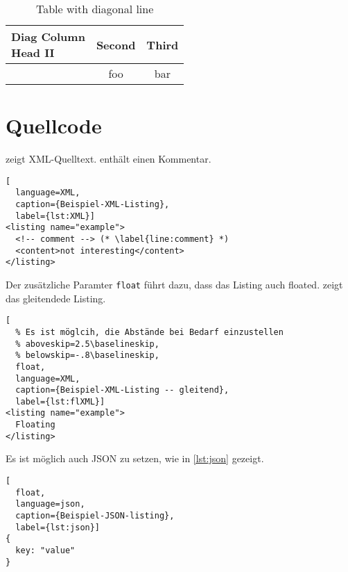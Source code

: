 \documentclass[
  numbers=autoendperiod,
  ngerman,  %
  a4paper,  %
  twoside,  %
  bibliography=totoc,
  headsepline,
  cleardoublepage=empty,
  parskip=half,
  draft=false
]{scrbook}
\theoremstyle{break}
\begin{document}
\begin{ltgexample}
\begin{table}
  \caption{Table with diagonal line}
  \label{tab:diag}
  \begin{center}
    \begin{tabular}{|l|c|c|}
      \hline
      \diagbox[width=10em]{Diag \\Column Head I}{Diag Column\\Head II} & Second & Third \\
      \hline
       & foo & bar              \\
      \hline
    \end{tabular}
  \end{center}
\end{table}
\end{ltgexample}


\section{Quellcode}

\begin{ltgexample}
 zeigt XML-Quelltext.
 enthält einen Kommentar.

\begin{lstlisting}[
  language=XML,
  caption={Beispiel-XML-Listing},
  label={lst:XML}]
<listing name="example">
  <!-- comment --> (* \label{line:comment} *)
  <content>not interesting</content>
</listing>
\end{lstlisting}
\end{ltgexample}

Der zusätzliche Paramter \verb+float+ führt dazu, dass das Listing auch floated.
 zeigt das gleitendede Listing.

\begin{ltgexample}
\begin{lstlisting}[
  % Es ist möglcih, die Abstände bei Bedarf einzustellen
  % aboveskip=2.5\baselineskip,
  % belowskip=-.8\baselineskip,
  float,
  language=XML,
  caption={Beispiel-XML-Listing -- gleitend},
  label={lst:flXML}]
<listing name="example">
  Floating
</listing>
\end{lstlisting}
\end{ltgexample}

Es ist möglich auch JSON zu setzen, wie in \cref{lst:json} gezeigt.

\begin{ltgexample}
\begin{lstlisting}[
  float,
  language=json,
  caption={Beispiel-JSON-listing},
  label={lst:json}]
{
  key: "value"
}
\end{lstlisting}
\end{ltgexample}
\end{document}

